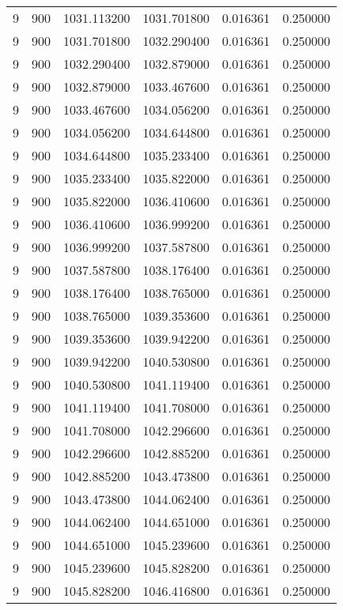 \begin{longtable}{rrrrrr}
9 & 900 & 1031.113200 & 1031.701800 & 0.016361 & 0.250000 \\
9 & 900 & 1031.701800 & 1032.290400 & 0.016361 & 0.250000 \\
9 & 900 & 1032.290400 & 1032.879000 & 0.016361 & 0.250000 \\
9 & 900 & 1032.879000 & 1033.467600 & 0.016361 & 0.250000 \\
9 & 900 & 1033.467600 & 1034.056200 & 0.016361 & 0.250000 \\
9 & 900 & 1034.056200 & 1034.644800 & 0.016361 & 0.250000 \\
9 & 900 & 1034.644800 & 1035.233400 & 0.016361 & 0.250000 \\
9 & 900 & 1035.233400 & 1035.822000 & 0.016361 & 0.250000 \\
9 & 900 & 1035.822000 & 1036.410600 & 0.016361 & 0.250000 \\
9 & 900 & 1036.410600 & 1036.999200 & 0.016361 & 0.250000 \\
9 & 900 & 1036.999200 & 1037.587800 & 0.016361 & 0.250000 \\
9 & 900 & 1037.587800 & 1038.176400 & 0.016361 & 0.250000 \\
9 & 900 & 1038.176400 & 1038.765000 & 0.016361 & 0.250000 \\
9 & 900 & 1038.765000 & 1039.353600 & 0.016361 & 0.250000 \\
9 & 900 & 1039.353600 & 1039.942200 & 0.016361 & 0.250000 \\
9 & 900 & 1039.942200 & 1040.530800 & 0.016361 & 0.250000 \\
9 & 900 & 1040.530800 & 1041.119400 & 0.016361 & 0.250000 \\
9 & 900 & 1041.119400 & 1041.708000 & 0.016361 & 0.250000 \\
9 & 900 & 1041.708000 & 1042.296600 & 0.016361 & 0.250000 \\
9 & 900 & 1042.296600 & 1042.885200 & 0.016361 & 0.250000 \\
9 & 900 & 1042.885200 & 1043.473800 & 0.016361 & 0.250000 \\
9 & 900 & 1043.473800 & 1044.062400 & 0.016361 & 0.250000 \\
9 & 900 & 1044.062400 & 1044.651000 & 0.016361 & 0.250000 \\
9 & 900 & 1044.651000 & 1045.239600 & 0.016361 & 0.250000 \\
9 & 900 & 1045.239600 & 1045.828200 & 0.016361 & 0.250000 \\
9 & 900 & 1045.828200 & 1046.416800 & 0.016361 & 0.250000 \\

\end{longtable}
